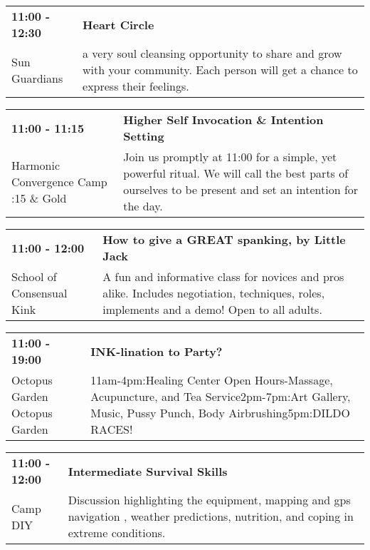 \begin{tabular}{ p{1in} p{2.2in} }
    \textbf{11:00 - 12:30} & \textbf{Heart Circle} \\
    Sun Guardians \newline  & a very soul cleansing opportunity to share and grow with your community. Each person will get a chance to express their feelings. \\
    \hline 
\end{tabular}
    
\begin{tabular}{ p{1in} p{2.2in} }
    \textbf{11:00 - 11:15} & \textbf{Higher Self Invocation \& Intention Setting} \\
    Harmonic Convergence Camp \newline 4:15 \& Gold & Join us promptly at 11:00 for a simple, yet powerful ritual.  We will call the best parts of ourselves to be present and set an intention for the day. \\
    \hline 
\end{tabular}
    
\begin{tabular}{ p{1in} p{2.2in} }
    \textbf{11:00 - 12:00} & \textbf{How to give a GREAT spanking, by Little Jack} \\
    School of Consensual Kink \newline  & A fun and informative class for novices and pros alike. Includes negotiation, techniques, roles, implements and a demo! Open to all adults. \\
    \hline 
\end{tabular}
    
\begin{tabular}{ p{1in} p{2.2in} }
    \textbf{11:00 - 19:00} & \textbf{INK-lination to Party?} \\
    Octopus Garden \newline Octopus Garden & 11am-4pm:Healing Center Open Hours-Massage, Acupuncture, and Tea Service2pm-7pm:Art Gallery, Music, Pussy Punch, Body Airbrushing5pm:DILDO RACES! \\
    \hline 
\end{tabular}
    
\begin{tabular}{ p{1in} p{2.2in} }
    \textbf{11:00 - 12:00} & \textbf{Intermediate Survival Skills} \\
    Camp DIY \newline  & Discussion highlighting the equipment, mapping and gps navigation , weather predictions, nutrition, and coping in extreme conditions. \\
    \hline 
\end{tabular}
    
